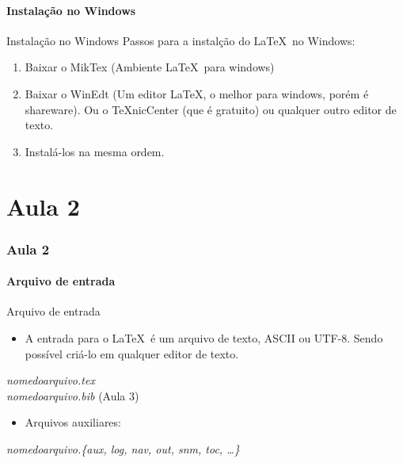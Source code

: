 \documentclass{beamer}
\begin{document}
\subsection{Instalação no Windows}

\begin{frame}{Instalação no Windows}
    Passos para a instalção do \LaTeX\ no Windows:
    
    \begin{enumerate}
    \item Baixar o MikTex (Ambiente \LaTeX\ para windows)
    \item Baixar o WinEdt (Um editor \LaTeX, o melhor para windows, porém é shareware). Ou o TeXnicCenter (que é gratuito) ou qualquer outro editor de texto.
    \item Instalá-los na mesma ordem.
    \end{enumerate}
\end{frame}


\part{Aula 2}
\section{Aula 2}

\subsection{Arquivo de entrada}

\begin{frame}{Arquivo de entrada}
	\begin{itemize}
	\item A entrada para o \LaTeX\ é um arquivo de texto, ASCII ou UTF-8. Sendo possível criá-lo em qualquer editor de texto.
	\end{itemize}
	
	\alert{\it nomedoarquivo.tex \\ nomedoarquivo.bib} (Aula 3)

	\vspace{.5cm}
	\pause

	\begin{itemize}
	\item Arquivos auxiliares:
	\end{itemize}
	
	{\it nomedoarquivo.\{aux, log, nav, out, snm, toc, \dots\} }
\end{frame}
\end{document}
